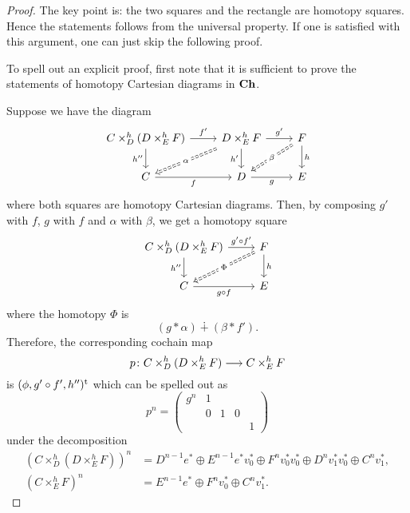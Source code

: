 \begin{proof}
The key point is: the two squares and 
the rectangle are homotopy squares. 
Hence the statements follows from the 
universal property. 
If one is satisfied with this argument, 
one can just skip the following proof.

To spell out an explicit proof, 
first note that it is sufficient 
to prove the statements 
of homotopy Cartesian diagrams in $\mathbf{Ch}$. 

Suppose we have the diagram
\[
\begin{tikzcd}
{C\times^h_D(D\times^h_EF)}\ar{r}{f'}\ar{d}[']{h''} & 
{D\times^h_EF}\ar{r}{g'}\ar{d}[']{h'}
\ar[dl,Rightarrow,dashed,"\alpha"description] & 
F\ar{d}{h}
\ar[dl,Rightarrow,dashed,"\beta"description] \\
C\ar{r}[']{f} & 
D\ar{r}[']{g} & 
E
\end{tikzcd}
\]
where both squares are 
homotopy Cartesian diagrams. 
Then, by composing 
$g'$ with $f$, 
$g$ with $f$ and
$\alpha$ with $\beta$, 
we get a homotopy square
\[
\begin{tikzcd}
{C\times^h_D(D\times^h_EF)}\ar{r}{g'\circ f'}\ar{d}[']{h''} & 
F\ar{d}{h}
\ar[dl,Rightarrow,dashed,"{\Phi}"description] \\
C\ar{r}[']{g\circ f} & 
E
\end{tikzcd}
\]
where the homotopy $\Phi$ is 
\[
(g\ast\alpha)\dotplus(\beta\ast f').
\]
Therefore, the corresponding cochain map 
\[
p\colon{C\times^h_D(D\times^h_EF)}\longrightarrow{C\times^h_EF}
\]
is $(\phi,g'\circ f',h'')^{\rm t}$ which can be spelled out as
\[
p^n=
\begin{pmatrix}
g^n & 1 & & & \\
& 0 & 1 & 0 & \\
& & & & 1
\end{pmatrix}
\]
under the decomposition
\begin{align*}
(C\times^h_D(D\times^h_EF))^n &=
D^{n-1}e^{\ast}\oplus 
E^{n-1}e^{\ast}v_0^{\ast}\oplus F^nv_0^{\ast}v_0^{\ast}
\oplus D^nv_1^{\ast}v_0^{\ast}
\oplus C^nv_1^{\ast},\\
(C\times^h_EF)^n &=
E^{n-1}e^{\ast}\oplus F^nv_0^{\ast}\oplus C^nv_1^{\ast}.
\end{align*}


\end{proof}
